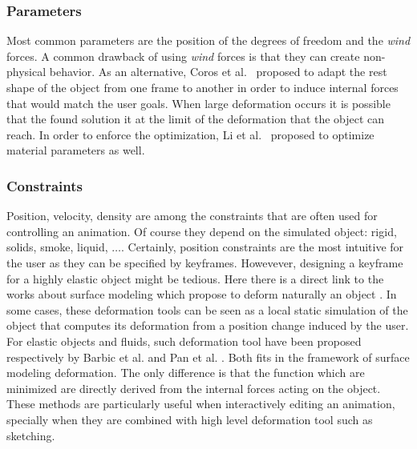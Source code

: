 \subsubsection{Parameters}
Most common parameters are the position of the degrees of freedom and the \emph{wind} forces. A common drawback of using \emph{wind} forces is that they can create non-physical behavior. As an alternative, Coros et al.~\cite{Coros2012} proposed to adapt the rest shape of the object from one frame to another in order to induce internal forces that would match the user goals. When large deformation occurs it is possible that the found solution it at the limit of the deformation that the object can reach. In order to enforce the optimization, Li et al.~\cite{Li2014} proposed to optimize material parameters as well. 

\subsubsection{Constraints}
Position, velocity, density are among the constraints that are often used for controlling an animation. Of course they depend on the simulated object: rigid, solids, smoke, liquid, $\dots$. Certainly, position constraints are the most intuitive for the user as they can be specified by keyframes. Howevever, designing a keyframe for a highly elastic object might be tedious. Here there is a direct link to the works about surface modeling which propose to deform naturally an object \cite{Sorkine2007, Hildebrandt2011}. In some cases, these deformation tools can be seen as a local static simulation of the object that computes its deformation from a position change induced by the user. For elastic objects and fluids, such deformation tool have been proposed respectively by Barbic et al. \cite{Barbic2012} and Pan et al. \cite{Pan2013}. Both fits in the framework of surface modeling deformation. The only difference is that the function which are minimized are directly derived from the internal forces acting on the object. These methods are particularly useful when interactively editing an animation, specially when they are combined with high level deformation tool such as sketching.

